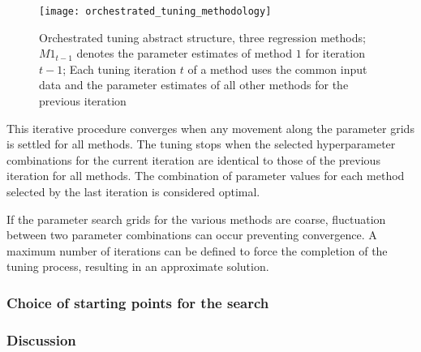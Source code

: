 \begin{figure}[bh]
	\centering
	\texttt{[image: orchestrated\_tuning\_methodology]}
	\caption{Orchestrated tuning abstract structure, three regression methods; $M1_{t-1}$ denotes the parameter estimates of method $1$ for iteration $t-1$; Each tuning iteration $t$ of a method uses the common input data and the parameter estimates of all other methods for the previous iteration}
	\label{fig:orc_tun_struct}
\end{figure}

This iterative procedure converges when any movement along the parameter grids is settled for all methods. The tuning stops when the selected hyperparameter combinations for the current iteration are identical to those of the previous iteration for all methods. The combination of parameter values for each method selected by the last iteration is considered optimal.

If the parameter search grids for the various methods are coarse, fluctuation between two parameter combinations can occur preventing convergence. A maximum number of iterations can be defined to force the completion of the tuning process, resulting in an approximate solution. 

\subsubsection{Choice of starting points for the search}

\subsubsection{Discussion}



